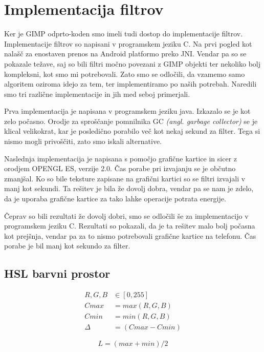 \section{Implementacija filtrov}
Ker je GIMP odprto-koden smo imeli tudi dostop do implementacije filtrov.
Implementacije filtrov so napisani v programskem jeziku C. Na prvi pogled kot
nalašč za enostaven prenos na Android platformo preko JNI. Vendar pa so se
pokazale težave, saj so bili filtri močno povezani z GIMP objekti ter nekoliko
bolj kompleksni, kot smo mi potrebovali. Zato smo se odločili, da vzamemo samo
algoritem oziroma idejo za tem, ter implementiramo po naših potrebah. Naredili
smo tri različne implementacije in jih med seboj primerjali.

Prva implementacija je napisana v programskem jeziku java. Izkazalo se je kot
zelo počasno. Orodje za sproščanje pomnilnika GC \textit{(angl. garbage
collector)} se je klical velikokrat, kar je posledično porabilo več kot nekaj
sekund za filter. Tega si nismo mogli privoščiti, zato smo iskali alternative.

Naslednja implementacija je napisana s pomočjo grafične kartice in sicer z
orodjem OPENGL ES, verzije 2.0. Čas porabe pri izvajanju se je občutno
zmanjšal. Ko so bile teksture zapisane na grafični kartici so se filtri
izvajali v manj kot sekundi. Ta rešitev je bila že dovolj dobra, vendar pa se
nam je zdelo, da je uporaba grafične kartice za tako lahke operacije potrata
energije.

Čeprav so bili rezultati že dovolj dobri, smo se odločili še za implementacijo
v programskem jeziku C. Rezultati so pokazali, da je ta rešitev malo bolj
počasna kot prejšnja, vendar pa za to nismo potrebovali grafične kartice na
telefonu. Čas porabe je bil manj kot sekundo za filter.

\subsection{HSL barvni prostor}
\label{sec:hsl}

\begin{align}
R, G, B &\in [0,255] \nonumber \\
Cmax &= max(R, G, B) \\
Cmin &= min(R, G, B) \\
\Delta &= (Cmax - Cmin)
\end{align}

\begin{equation}
L = (max + min) / 2 \label{eq:hsl_l}
\end{equation}

